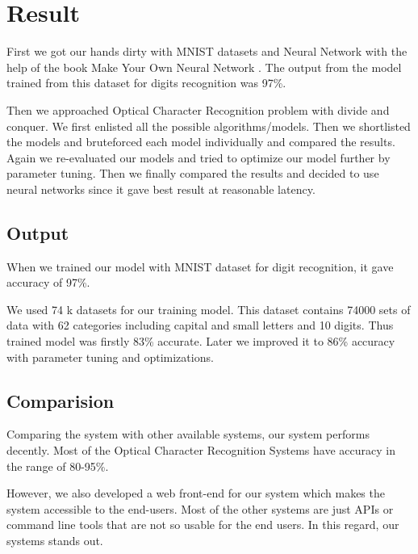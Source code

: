 \chapter{Result}
First we got our hands dirty with MNIST datasets and Neural Network with the help of the book Make Your Own Neural Network \autocite{make_own}. The output from the model trained from this dataset for digits recognition was 97\%.

Then we approached Optical Character Recognition problem with divide and conquer. We first enlisted all the possible algorithms/models. Then we shortlisted the models and bruteforced each model individually and compared the results. Again we re-evaluated our models and tried to optimize our model further by parameter tuning. Then we finally compared the results and decided to use neural networks since it gave best result at reasonable latency.

\section{Output}
When we trained our model with MNIST dataset for digit recognition, it gave accuracy of 97\%. 

We used 74 k datasets for our training model. This dataset contains 74000 sets of data with 62 categories including capital and small letters and 10 digits. Thus trained model was firstly 83\% accurate. Later we improved it to 86\% accuracy with parameter tuning and optimizations.

\section{Comparision}
Comparing the system with other available systems, our system performs decently. Most of the Optical Character Recognition Systems have accuracy in the range of 80-95\%. 

However, we also developed a web front-end for our system which makes the system accessible to the end-users. Most of the other systems are just APIs or command line tools that are not so usable for the end users. In this regard, our systems stands out.
